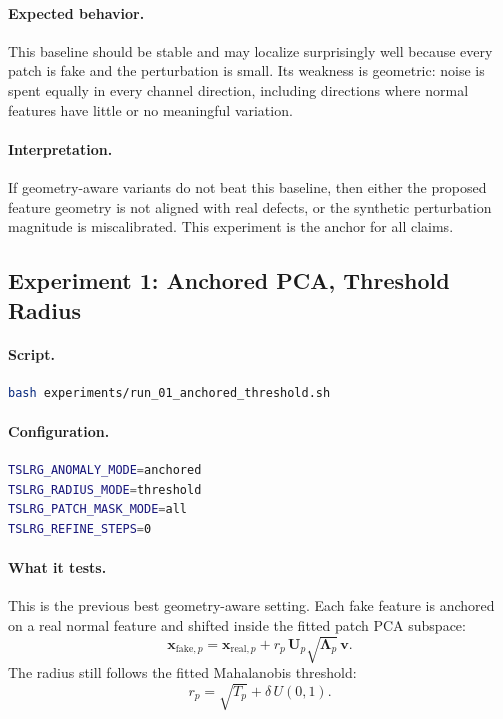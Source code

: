 \documentclass[11pt]{article}
\newcommand{\Up}{\mathbf{U}_p}
\newcommand{\Lp}{\boldsymbol{\Lambda}_p}
\begin{document}
\paragraph{Expected behavior.}
This baseline should be stable and may localize surprisingly well because every
patch is fake and the perturbation is small. Its weakness is geometric: noise is
spent equally in every channel direction, including directions where normal
features have little or no meaningful variation.

\paragraph{Interpretation.}
If geometry-aware variants do not beat this baseline, then either the proposed
feature geometry is not aligned with real defects, or the synthetic perturbation
magnitude is miscalibrated. This experiment is the anchor for all claims.

\subsection{Experiment 1: Anchored PCA, Threshold Radius}

\paragraph{Script.}
\begin{lstlisting}[language=bash]
bash experiments/run_01_anchored_threshold.sh
\end{lstlisting}

\paragraph{Configuration.}
\begin{lstlisting}[language=bash]
TSLRG_ANOMALY_MODE=anchored
TSLRG_RADIUS_MODE=threshold
TSLRG_PATCH_MASK_MODE=all
TSLRG_REFINE_STEPS=0
\end{lstlisting}

\paragraph{What it tests.}
This is the previous best geometry-aware setting. Each fake feature is anchored
on a real normal feature and shifted inside the fitted patch PCA subspace:
\begin{equation}
  \mathbf{x}_{\mathrm{fake},p}
    =
  \mathbf{x}_{\mathrm{real},p}
    +
  r_p\,\Up\sqrt{\Lp}\,\mathbf{v}.
\end{equation}
The radius still follows the fitted Mahalanobis threshold:
\begin{equation}
  r_p = \sqrt{T_p} + \delta\,U(0,1).
\end{equation}
\end{document}
